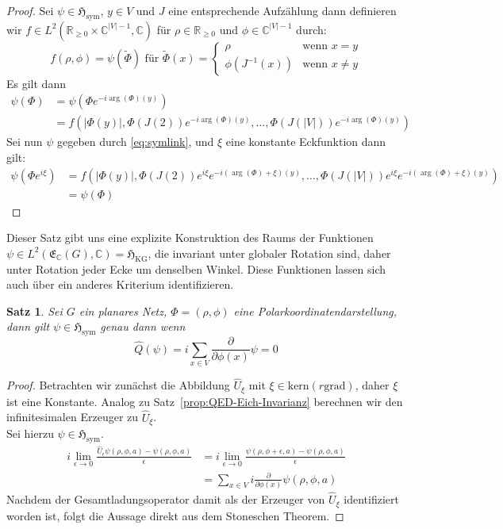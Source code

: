 \documentclass[11pt,a4paper,leqno]{report}
\newtheorem{proposition}{Satz}[chapter]
\numberwithin{equation}{chapter}
\begin{document}
\begin{proof}
Sei $\psi\in \mathfrak{H}_{\text{sym}}$, $y\in V$ und $J$ eine entsprechende Aufzählung dann definieren
wir $f\in L^2(\mathbb{R}_{\geq0}\times\mathbb{C}^{|V|-1}, \mathbb{C})$ für $\rho\in \mathbb{R}_{\geq0}$ und $\phi\in\mathbb{C}^{|V|-1}$ durch:
\[
f(\rho, \phi) = \psi(\tilde{\Phi})\textrm{ für } \tilde{\Phi}(x) = \begin{cases}
	\rho & \text{wenn } x = y \\
	\phi(J^{-1}(x)) & \text{wenn } x \neq y
\end{cases}
\]
Es gilt dann
\begin{align*}
\psi(\Phi) &= \psi(\Phi e^{-i\arg(\Phi)(y)}) \\&= f(|\Phi(y)|,\Phi(J(2))e^{-i\arg(\Phi)(y)},\dots,\Phi(J(|V|))e^{-i\arg(\Phi)(y)})
\end{align*}
Sei nun $\psi$ gegeben durch \eqref{eq:symlink}, und $\xi$ eine konstante Eckfunktion dann gilt:
\begin{align*}
\psi(\Phi e^{i\xi}) &= f(|\Phi(y)|,\Phi(J(2)) e^{i\xi} e^{-i(\arg(\Phi) +\xi)(y)},\dots,\Phi(J(|V|)) e^{i\xi}e^{-i(\arg(\Phi) +\xi)(y)})\\&=\psi(\Phi)
\end{align*}
\end{proof}
\noindent
Dieser Satz gibt uns eine explizite Konstruktion des Raums der Funktionen $\psi\in L^2(\mathfrak{E}_\mathbb{C}(G), \mathbb{C})=\mathfrak{H}_{\mathrm{KG}}$, die invariant unter globaler Rotation sind, daher unter Rotation jeder Ecke um denselben Winkel. Diese Funktionen lassen sich auch \"uber ein anderes Kriterium identifizieren.
\begin{proposition}
	Sei $G$ ein planares Netz, $\Phi = (\rho, \phi)$ eine Polarkoordinatendarstellung, dann gilt $\psi\in \mathfrak{H}_{\text{sym}}$ genau dann wenn
	\begin{equation}
		\hat{Q}(\psi)=i\sum_{x\in V}\frac{\partial}{\partial \phi(x)}\psi = 0
	\end{equation}
\end{proposition}
\begin{proof}
	Betrachten wir zun\"achst die Abbildung $\hat{U}_\xi$ mit $\xi\in\text{kern}(r\text{grad})$, daher $\xi$ ist eine Konstante. Analog zu Satz~\ref{prop:QED-Eich-Invarianz} berechnen wir den infinitesimalen Erzeuger zu $\hat{U}_\xi$. \\
	Sei hierzu $\psi\in \mathfrak{H}_{\text{sym}}$.
	\begin{align*}
		i\lim_{\epsilon\rightarrow 0}\frac{\hat{U}_\epsilon\psi(\rho, \phi, a)-\psi(\rho, \phi, a)}{\epsilon} &= i\lim_{\epsilon\rightarrow 0}\frac{\psi(\rho, \phi +\epsilon, a)-\psi(\rho, \phi, a)}{\epsilon}\\
		&=\sum_{x\in V}i\frac{\partial}{\partial \phi(x)}\psi(\rho, \phi, a)
	\end{align*}
	Nachdem der Gesamtladungsoperator damit als der Erzeuger von $\hat{U}_\xi$ identifiziert worden ist, folgt die Aussage direkt aus dem Stoneschen Theorem.
\end{proof}
\end{document}
